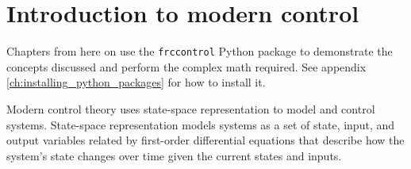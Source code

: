 
\chapter{Introduction to modern control}

\begin{remark}
  Chapters from here on use the \texttt{frccontrol} Python package to
  demonstrate the concepts discussed and perform the complex math required. See
  appendix \ref{ch:installing_python_packages} for how to install it.
\end{remark}

Modern control theory uses state-space representation to model and control
systems. State-space representation models \glspl{system} as a set of
\gls{state}, \gls{input}, and \gls{output} variables related by first-order
differential equations that describe how the \gls{system}'s \gls{state} changes
over time given the current \glspl{state} and \glspl{input}.

\renewcommand*{\chapterpath}{\partpath/intro-to-modern-control}






